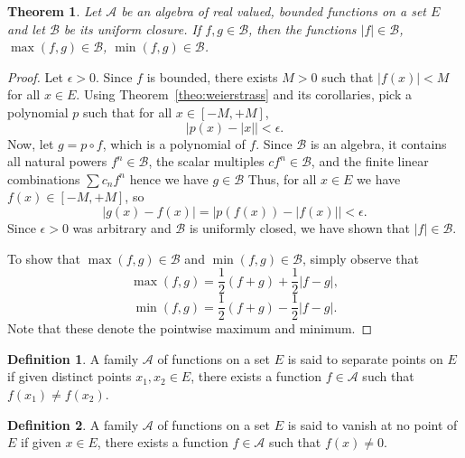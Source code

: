 \documentclass[11pt]{article}
\newtheorem{theorem}{Theorem}[section]
\theoremstyle{definition}
\newtheorem{definition}{Definition}[section]
\theoremstyle{remark}
\begin{document}
    \begin{theorem} \label{theo:abs_max_min}
        Let $\mathscr{A}$ be an algebra of real valued, bounded functions on a set
        $E$ and let $\mathscr{B}$ be its uniform closure. If $f, g\in \mathscr{B}$,
        then the functions $|f| \in \mathscr{B}$, $\max(f, g) \in \mathscr{B}$,
        $\min(f, g) \in \mathscr{B}$.
    \end{theorem}
    \begin{proof}
        Let $\epsilon > 0$.
        Since $f$ is bounded, there exists $M > 0$ such that $|f(x)| < M$ for all $x
        \in E$. Using Theorem~\ref{theo:weierstrass} and its corollaries, pick a
        polynomial $p$ such that for all $x \in [-M, +M]$, \[
            | p(x) - |x| | < \epsilon.
        \] Now, let $g = p \circ f$, which is a polynomial of $f$. Since
        $\mathscr{B}$ is an algebra, it contains all natural powers $f^n \in
        \mathscr{B}$, the scalar multiples $cf^n \in \mathscr{B}$, and the finite
        linear combinations $\sum c_nf^n$ hence we have $g \in \mathscr{B}$ Thus, for
        all $x \in E$ we have $f(x) \in [-M, +M]$, so \[
            |g(x) - f(x)| = | p(f(x)) - |f(x)| | < \epsilon.
        \] Since $\epsilon > 0$ was arbitrary and $\mathscr{B}$ is uniformly closed,
        we have shown that $|f| \in \mathscr{B}$.

        To show that $\max(f, g) \in \mathscr{B}$ and $\min(f, g) \in \mathscr{B}$,
        simply observe that \[
            \max(f, g) = \frac{1}{2}(f + g) + \frac{1}{2}|f - g|,
        \] \[
            \min(f, g) = \frac{1}{2}(f + g) - \frac{1}{2}|f - g|.
        \] Note that these denote the pointwise maximum and minimum.
    \end{proof}

    \begin{definition}
        A family $\mathscr{A}$ of functions on a set $E$ is said to separate points
        on $E$ if given distinct points $x_1, x_2 \in E$, there exists a function $f \in
        \mathscr{A}$ such that $f(x_1) \neq f(x_2)$.
    \end{definition}

    \begin{definition}
        A family $\mathscr{A}$ of functions on a set $E$ is said to vanish at no
        point of $E$ if given $x \in E$, there exists a function $f \in \mathscr{A}$
        such that $f(x) \neq 0$.
    \end{definition}
\end{document}
